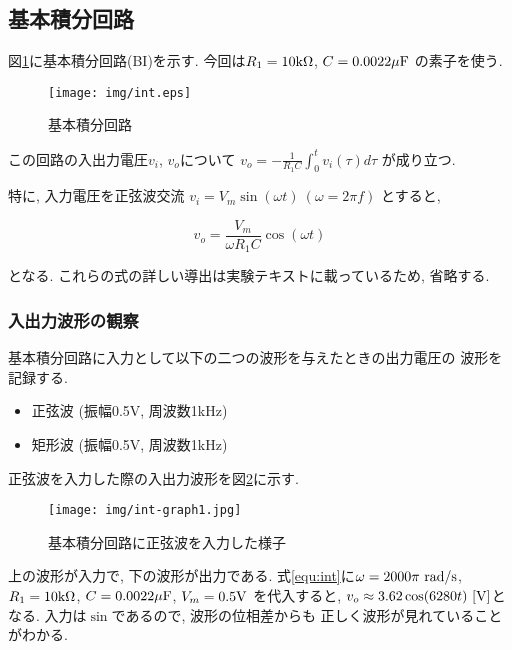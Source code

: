 \documentclass[titlepage]{jsarticle}
\begin{document}
    \subsection{基本積分回路}
        図\ref{fig:int}に基本積分回路(BI)を示す.
        今回は$R_1 = 10\rm{k\Omega}$, $C = 0.0022\rm{\mu F}$
        の素子を使う.

        \begin{figure}[h]
            \centering
            \texttt{[image: img/int.eps]}
            \caption{基本積分回路}
            \label{fig:int}
        \end{figure}

        この回路の入出力電圧$v_i$, $v_o$について
        $\displaystyle v_o = -\frac{1}{R_1C}\int^t_0v_i(\tau)d\tau$
        が成り立つ.

        特に, 入力電圧を正弦波交流
        $v_i = V_m\sin(\omega t) \ (\omega = 2\pi f)$
        とすると,

        \begin{equation}
            v_o = \frac{V_m}{\omega R_1C}\cos(\omega t) \label{equ:int}
        \end{equation}

        となる.
        これらの式の詳しい導出は実験テキスト\cite{text}に載っているため,
        省略する.

        \subsubsection{入出力波形の観察}
            基本積分回路に入力として以下の二つの波形を与えたときの出力電圧の
            波形を記録する.

            \begin{itemize}
                \item 正弦波 (振幅0.5V, 周波数1kHz)
                \item 矩形波 (振幅0.5V, 周波数1kHz)
            \end{itemize}

            正弦波を入力した際の入出力波形を図\ref{fig:int1}に示す.

            \begin{figure}[h]
                \centering
                \texttt{[image: img/int-graph1.jpg]}
                \caption{基本積分回路に正弦波を入力した様子}
                \label{fig:int1}
            \end{figure}

            上の波形が入力で, 下の波形が出力である.
            式\ref{equ:int}に$\omega = 2000\pi \ \rm{rad/s}$,
            $R_1 = 10 \rm{k\Omega}$, $C = 0.0022 \rm{\mu F}$,
            $V_m = 0.5 \rm{V}$
            を代入すると, $v_o \approx 3.62 \cos(6280t) \ \rm{[V]}$となる.
            入力は$\sin$であるので, 波形の位相差からも
            正しく波形が見れていることがわかる.
\end{document}
